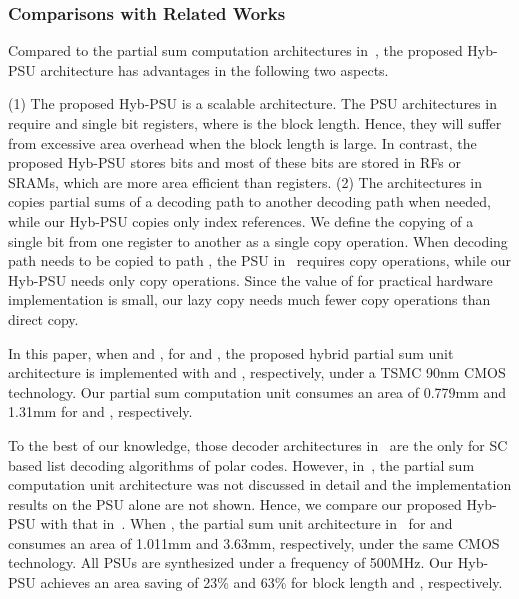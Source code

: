 \documentclass[journal]{IEEEtran}
\begin{document}
\subsubsection{Comparisons with Related Works}
Compared to the partial sum computation architectures in~\cite{tree_list_dec, jun_low_mem_list}, the proposed Hyb-PSU architecture has advantages in the following two aspects.

(1) The proposed Hyb-PSU is a scalable architecture. The PSU architectures in~\cite{tree_list_dec, jun_low_mem_list} require  and  single bit registers, where  is the block length. Hence, they will suffer from excessive area overhead when the block length  is large. In contrast, the proposed Hyb-PSU stores  bits and most of these bits are stored in RFs or SRAMs, which are more area efficient than registers. 
(2) The architectures in~\cite{tree_list_dec, jun_low_mem_list} copies partial sums of a decoding path to another decoding path when needed, while our Hyb-PSU copies only index references. We define the copying of a single bit from one register to another as a single copy operation. When decoding path  needs to be copied to path , the PSU in~\cite{jun_low_mem_list} requires  copy operations, while our Hyb-PSU needs only  copy operations. Since the value of  for practical hardware implementation is small, our lazy copy needs much fewer copy operations than direct copy.

In this paper, when  and , for  and , the proposed hybrid partial sum unit architecture is implemented with  and , respectively, under a TSMC 90nm CMOS technology. Our partial sum computation unit consumes an area of 0.779mm and 1.31mm for  and , respectively.

To the best of our knowledge, those decoder architectures in~\cite{tree_list_dec, jun_low_mem_list, chuan_list, yuan_low_latency} are the only for SC based list decoding algorithms of polar codes. However, in~\cite{tree_list_dec,chuan_list, yuan_low_latency}, the partial sum computation unit architecture was not discussed in detail and the implementation results on the PSU alone are not shown. Hence, we compare our proposed Hyb-PSU with that in~\cite{jun_low_mem_list}.
When , the partial sum unit architecture in~\cite{jun_low_mem_list} for  and   consumes an area of 1.011mm and 3.63mm, respectively, under the same CMOS technology. All PSUs are synthesized under a frequency of 500MHz. Our Hyb-PSU achieves an area saving of 23\% and 63\% for block length  and , respectively.
\end{document}

